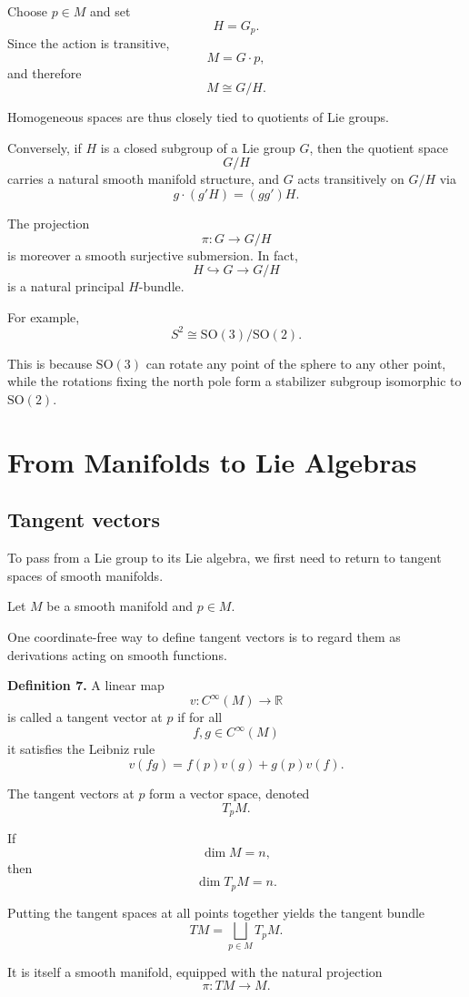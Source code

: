 \documentclass[11pt]{article}
\begin{document}
Choose $p\in M$ and set
\[
H=G_p.
\]
Since the action is transitive,
\[
M=G\cdot p,
\]
and therefore
\[
M\cong G/H.
\]

Homogeneous spaces are thus closely tied to quotients of Lie groups.

Conversely, if $H$ is a closed subgroup of a Lie group $G$, then the quotient space
\[
G/H
\]
carries a natural smooth manifold structure, and $G$ acts transitively on $G/H$ via
\[
g\cdot(g'H)
=
(gg')H.
\]

The projection
\[
\pi:G\to G/H
\]
is moreover a smooth surjective submersion. In fact,
\[
H\hookrightarrow G\longrightarrow G/H
\]
is a natural principal $H$-bundle.

For example,
\[
S^2
\cong
\mathrm{SO}(3)/\mathrm{SO}(2).
\]

This is because $\mathrm{SO}(3)$ can rotate any point of the sphere to any other point, while the rotations fixing the north pole form a stabilizer subgroup isomorphic to $\mathrm{SO}(2)$.


\section{From Manifolds to Lie Algebras}

\subsection{Tangent vectors}

To pass from a Lie group to its Lie algebra, we first need to return to tangent spaces of smooth manifolds.

Let $M$ be a smooth manifold and $p\in M$.

One coordinate-free way to define tangent vectors is to regard them as derivations acting on smooth functions.

\textbf{Definition 7.}
A linear map
\[
v:C^\infty(M)\to\mathbb{R}
\]
is called a tangent vector at $p$ if for all
\[
f,g\in C^\infty(M)
\]
it satisfies the Leibniz rule
\[
v(fg)
=
f(p)v(g)+g(p)v(f).
\]

The tangent vectors at $p$ form a vector space, denoted
\[
T_pM.
\]

If
\[
\dim M=n,
\]
then
\[
\dim T_pM=n.
\]

Putting the tangent spaces at all points together yields the tangent bundle
\[
TM
=
\bigsqcup_{p\in M}T_pM.
\]

It is itself a smooth manifold, equipped with the natural projection
\[
\pi:TM\to M.
\]
\end{document}
